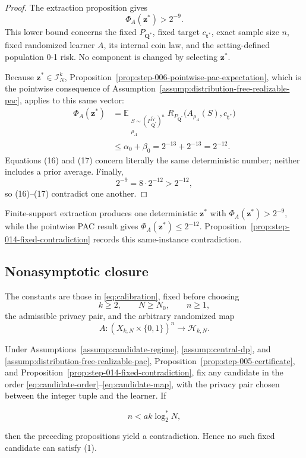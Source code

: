 \begin{proof}
The extraction proposition gives
\[
\Phi_A(\boldsymbol z^*)>2^{-9}.
\tag{16}
\]
This lower bound concerns the fixed \(P_{\boldsymbol Q^*}\), fixed target
\(c_{\boldsymbol t^*}\), exact sample size \(n\), fixed randomized learner
\(A\), its internal coin law, and the setting-defined population 0-1 risk.
No component is changed by selecting \(\boldsymbol z^*\).

Because \(\boldsymbol z^*\in\mathcal I_N^k\), Proposition~\ref{prop:step-006-pointwise-pac-expectation}, which is the
pointwise consequence of Assumption~\ref{assump:distribution-free-realizable-pac},
applies to this same vector:
\[
\begin{aligned}
\Phi_A(\boldsymbol z^*)
&=\mathbb E_{\substack{
  S\sim(P_{\boldsymbol Q^*}^{c_{\boldsymbol t^*}})^n\\ \rho_A}}
  R_{P_{\boldsymbol Q^*}}\bigl(A_{\rho_A}(S),c_{\boldsymbol t^*}\bigr)\\
&\le\alpha_0+\beta_0
=2^{-13}+2^{-13}=2^{-12}.
\end{aligned}
\tag{17}
\]
Equations (16) and (17) concern literally the same deterministic number;
neither includes a prior average. Finally,
\[
2^{-9}=8\cdot2^{-12}>2^{-12},
\tag{18}
\]
so (16)--(17) contradict one another. \end{proof}
Finite-support extraction produces one deterministic $\boldsymbol z^*$
with $\Phi_A(\boldsymbol z^*)>2^{-9}$, while the pointwise PAC result gives
$\Phi_A(\boldsymbol z^*)\le2^{-12}$.  Proposition~\ref{prop:step-014-fixed-contradiction}
records this same-instance contradiction.

\subsection{Nonasymptotic closure}\label{app:step-015}
The constants are those in \eqref{eq:calibration}, fixed before choosing
\begin{equation}
k\ge2,
\qquad N\ge N_0,
\qquad n\ge1,
\tag{T2}\label{eq:candidate-order}
\end{equation}
the admissible privacy pair, and the arbitrary randomized map
\begin{equation}
A:(X_{k,N}\times\{0,1\})^n\longrightarrow\mathcal H_{k,N}.
\tag{T4}\label{eq:candidate-map}
\end{equation}
\begin{lemma}\label{lem:step-015-negated-target}
Under Assumptions~\ref{assump:candidate-regime},
\ref{assump:central-dp}, and
\ref{assump:distribution-free-realizable-pac},
Proposition~\ref{prop:step-005-certificate}, and
Proposition~\ref{prop:step-014-fixed-contradiction}, fix any candidate in
the order \eqref{eq:candidate-order}--\eqref{eq:candidate-map}, with the
privacy pair chosen between the integer tuple and the learner. If

\[
n<ak\log_2^*N,
\tag{1}
\]

then the preceding propositions yield a contradiction. Hence no
such fixed candidate can satisfy (1).
\end{lemma}

